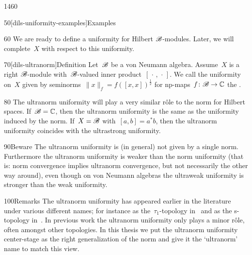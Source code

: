 \begin{parsec}{1460}
\begin{point}{50}[dils-uniformity-examples]{Examples}
\begin{enumerate}
    \end{enumerate}
    \spacingfix{}
\begin{point}{60}%
We are ready to define a uniformity for Hilbert $\mathscr{B}$-modules.
Later, we will complete~$X$ with respect to this uniformity.
\end{point}
\end{point}
\begin{point}{70}[dils-ultranorm]{Definition}%
Let~$\mathscr{B}$ be a von Neumann algebra.
Assume~$X$ is a right $\mathscr{B}$-module
    with~$\mathscr{B}$-valued inner product~$[\,\cdot\,,\,\cdot\,]$.
We call the uniformity on~$X$
    given by seminorms~$\|x\|_f = f([x,x])^{\frac{1}{2}}$
    for np-maps~$f\colon \mathscr{B} \to \mathbb{C}$
    the .
\begin{point}{80}%
The ultranorm uniformity will play a very similar r\^ole
    to the norm for Hilbert spaces.
If~$\mathscr{B}=\mathbb{C}$, then the ultranorm uniformity is
    the same as the uniformity induced by the norm.
If~$X=\mathscr{B}$ with~$[a,b]=a^*b$,
    then the ultranorm uniformity coincides with the ultrastrong uniformity.
\end{point}
\begin{point}{90}{Beware}%
    The ultranorm uniformity is (in general) not given by a single norm.
    Furthermore the ultranorm uniformity is weaker than the norm uniformity
        (that is: norm convergence implies ultranorm convergence,
            but not necessarily the other way around),
        even though on von Neumann algebras the
        ultraweak uniformity
        is stronger than the weak uniformity.
\end{point}
\begin{point}{100}{Remarks}%
The ultranorm uniformity has appeared earlier in the literature
    under various different names; for instance as the~$\tau_1$-topology
    in~\cite[thm.~3.5.1]{manuilov2000hilbertc} and as the s-topology
    in~\cite[2.9]{ghez1985w}.
In previous work the ultranorm uniformity only plays a minor r\^ole,
    often amongst other topologies.
In this thesis we put the ultranorm uniformity center-stage
    as the right generalization of the norm
    and give it the `ultranorm' name to match this view.
\end{point}
\end{point}
\end{parsec}

